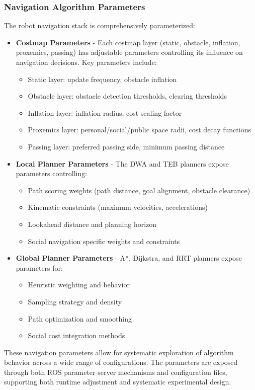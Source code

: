 \subsubsection{Navigation Algorithm Parameters}
The robot navigation stack is comprehensively parameterized:
\begin{itemize}
    \item \textbf{Costmap Parameters} - Each costmap layer (static, obstacle, 
    inflation, proxemics, passing) has adjustable parameters controlling its 
    influence on navigation decisions. Key parameters include:
    \begin{itemize}
        \item Static layer: update frequency, obstacle inflation
        \item Obstacle layer: obstacle detection thresholds, clearing thresholds
        \item Inflation layer: inflation radius, cost scaling factor
        \item Proxemics layer: personal/social/public space radii, cost decay functions
        \item Passing layer: preferred passing side, minimum passing distance
    \end{itemize}
    \item \textbf{Local Planner Parameters} - The DWA and TEB planners 
    expose parameters controlling:
    \begin{itemize}
        \item Path scoring weights (path distance, goal alignment, obstacle clearance)
        \item Kinematic constraints (maximum velocities, accelerations)
        \item Lookahead distance and planning horizon
        \item Social navigation specific weights and constraints
    \end{itemize}
    \item \textbf{Global Planner Parameters} - A*, Dijkstra, and RRT planners expose parameters for:
    \begin{itemize}
        \item Heuristic weighting and behavior
        \item Sampling strategy and density
        \item Path optimization and smoothing
        \item Social cost integration methods
    \end{itemize}
\end{itemize}
These navigation parameters allow for systematic exploration of algorithm behavior 
across a wide range of configurations. The parameters are exposed through both ROS 
parameter server mechanisms and configuration files, supporting both runtime adjustment 
and systematic experimental design.

